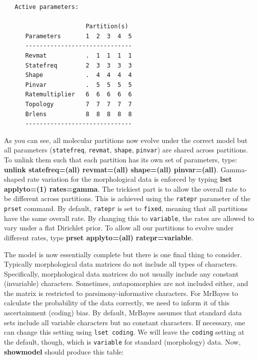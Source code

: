 \documentclass[12pt]{book}
\begin{document}
\begin{singlespacing}
\small
\begin{verbatim}
   Active parameters:
 
                       Partition(s)
      Parameters       1  2  3  4  5
      ------------------------------
      Revmat           .  1  1  1  1
      Statefreq        2  3  3  3  3
      Shape            .  4  4  4  4
      Pinvar           .  5  5  5  5
      Ratemultiplier   6  6  6  6  6
      Topology         7  7  7  7  7
      Brlens           8  8  8  8  8
      ------------------------------
\end{verbatim}
\normalsize
\end{singlespacing}

As you can see, all molecular partitions now evolve under the correct model but all parameters 
(\texttt{statefreq}, \texttt{revmat}, \texttt{shape}, \texttt{pinvar}) are shared across partitions. To 
unlink them such that each partition has its own set of parameters, type:  \textbf{unlink statefreq=(all) 
revmat=(all) shape=(all) pinvar=(all)}. Gamma-shaped rate variation for the morphological data is enforced 
by typing \textbf{lset applyto=(1) rates=gamma}. The trickiest part is to allow the overall rate to be different 
across partitions. This is achieved using the \texttt{ratepr} parameter of the \texttt{prset} command. By 
default, \texttt{ratepr} is set to \texttt{fixed}, meaning that all partitions have the same overall rate. 
By changing this to \texttt{variable}, the rates are allowed to vary under a flat Dirichlet prior. To allow all our 
partitions to evolve under different rates, type \textbf{prset applyto=(all) ratepr=variable}.

The model is now essentially complete but there is one final thing to consider. Typically morphological data 
matrices do not include all types of characters. Specifically, morphological data matrices do not usually 
include any constant (invariable) characters. Sometimes, autapomorphies are not included either, and the 
matrix is restricted to parsimony-informative characters. For MrBayes to calculate the probability of the 
data correctly, we need to inform it of this ascertainment (coding) bias. By default, MrBayes assumes that 
standard data sets include all variable characters but no constant characters. If necessary, one can change 
this setting using \texttt{lset coding}. We will leave the \texttt{coding} setting at the default, though, 
which is \texttt{variable} for standard (morphology) data. Now, \textbf{showmodel} should produce this table:
\end{document}
